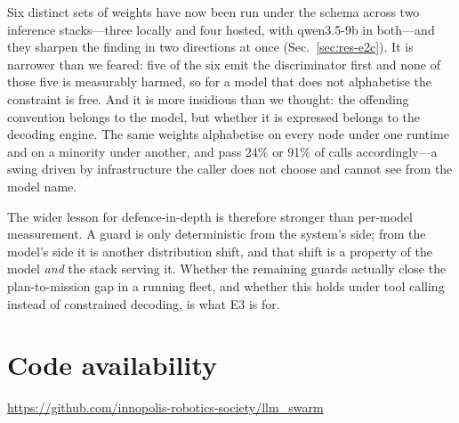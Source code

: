 \documentclass[10pt,twocolumn]{article}
\begin{document}
Six distinct sets of weights have now been run under the schema across two
inference stacks---three locally and four hosted, with qwen3.5-9b in both---and
they sharpen the finding in two directions at once
(Sec.~\ref{sec:res-e2c}). It is narrower than we feared: five of the six emit
the discriminator first and none of those five is measurably harmed, so for a
model that does not alphabetise the constraint is free. And it is more
insidious than we thought: the offending convention belongs to the model, but
whether it is expressed belongs to the decoding engine. The same weights
alphabetise on every node under one runtime and on a minority under another,
and pass 24\% or 91\% of calls accordingly---a swing driven by infrastructure
the caller does not choose and cannot see from the model name.

The wider lesson for defence-in-depth is therefore stronger than
per-model measurement. A guard is only deterministic from the system's side;
from the model's side it is another distribution shift, and that shift is a
property of the model \emph{and} the stack serving it. Whether the remaining
guards actually close the plan-to-mission gap in a running fleet, and whether
this holds under tool calling instead of constrained decoding, is what E3 is
for.

\section*{Code availability}

\url{https://github.com/innopolis-robotics-society/llm_swarm}
\end{document}
